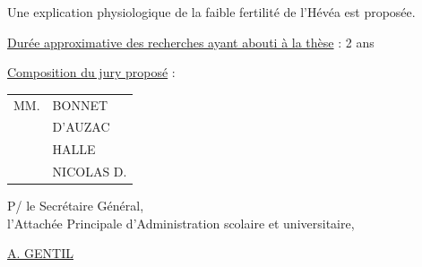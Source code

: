 Une explication physiologique de la faible fertilité de l'Hévéa est proposée.

\uline{Durée approximative des recherches ayant abouti à la thèse} : 2 ans

\uline{Composition du jury proposé} : \begin{tabular}[t]{ll}
MM. & BONNET\\
& D'AUZAC\\
& HALLE\\
& NICOLAS D.
\end{tabular}

\begin{flushright}
P/ le Secrétaire Général,\\
l'Attachée Principale d'Administration scolaire et universitaire,


\uline{A. GENTIL}
\end{flushright}

